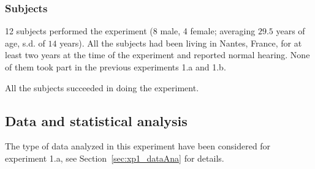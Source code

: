 \documentclass[12pt]{elsarticle}
\begin{document}
\subsubsection*{Subjects}


12 subjects performed the experiment (8 male, 4 female; averaging $29.5$ years of age, s.d. of $14$ years). All the subjects had been living in Nantes, France, for at least two years at the time of the experiment and reported normal hearing. None of them took part in the previous experiments 1.a and 1.b.


All the subjects succeeded in doing the experiment.

\subsection{Data and statistical analysis}


The type of data analyzed in this experiment have been considered for experiment 1.a, see Section~\ref{sec:xp1_dataAna} for details.

\end{document}
